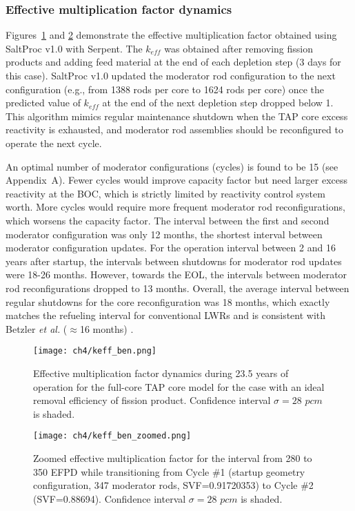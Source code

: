 \subsubsection{Effective multiplication factor dynamics}
Figures~\ref{fig:keff-ben-valid} and \ref{fig:keff-ben-valid-zoomed} 
demonstrate the effective multiplication factor obtained using SaltProc v1.0 
with Serpent. The $k_{eff}$ was obtained after removing fission products and 
adding feed material at the end of each depletion step (3 days for this case). 
SaltProc v1.0 updated the moderator rod configuration to the next 
configuration (e.g., from 1388 rods per core to 1624 rods per core) once the
predicted value of $k_{eff}$ at the end of the next depletion step dropped 
below 1. 
This algorithm mimics regular maintenance shutdown when the \gls{TAP} core 
excess reactivity is exhausted, and moderator rod assemblies should be 
reconfigured to operate the next cycle. 

An optimal number of moderator configurations (cycles) is found to be 15 (see 
Appendix~A). Fewer cycles would improve capacity factor 
but need larger excess reactivity at the \gls{BOC}, which is strictly limited 
by reactivity control system worth. More cycles would require more frequent 
moderator rod reconfigurations, which worsens the capacity factor.  The 
interval between the first and second moderator configuration was only 12 
months, the shortest interval between moderator configuration updates. For the 
operation interval between 2 and 16 years after startup, the intervals between 
shutdowns for moderator rod updates were 18-26 months. However, towards the 
\gls{EOL}, the intervals between moderator rod reconfigurations dropped to 13 
months. 
Overall, the average interval between regular shutdowns for the core 
reconfiguration was 18 months, which exactly matches the refueling interval 
for conventional \glspl{LWR} and is consistent with Betzler \emph{et al.} 
($\approx$16 months) \cite{betzler_assessment_2017-1}.
\begin{figure}[htp!] %
	\centering
	\texttt{[image: ch4/keff\_ben.png]}
		\vspace{-9mm}
	\caption{Effective multiplication factor dynamics during 23.5 years of 
	operation for the full-core \gls{TAP} core model for the case with an 
	ideal removal efficiency of fission product. Confidence interval 
	$\sigma=28$ $pcm$ is shaded.}
	\label{fig:keff-ben-valid}
\end{figure}
\begin{figure}[htp!] %
	\centering
	\texttt{[image: ch4/keff\_ben\_zoomed.png]}
		\vspace{-4mm}
	\caption{Zoomed effective multiplication factor for the interval from 280 
		to 350 EFPD while transitioning from Cycle \#1 (startup geometry 
		configuration, 347 moderator rods, \gls{SVF}=0.91720353) to Cycle \#2 
		(\gls{SVF}=0.88694). Confidence interval $\sigma=28$ $pcm$ is 
		shaded.}
	\label{fig:keff-ben-valid-zoomed}
\end{figure}

